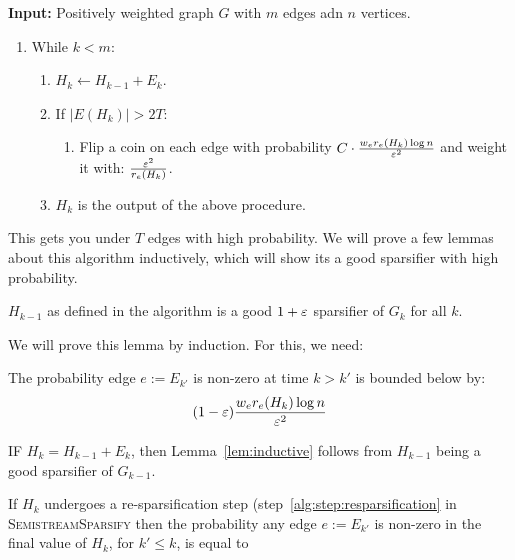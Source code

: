\begin{algorithm}
  \caption{$\textsc{SemistreamSparsify}(G, \eps)$}
\textbf{Input:} Positively weighted graph $G$ with $m$ edges adn $n$ vertices.

\begin{enumerate}
\item While $k < m$:
\begin{enumerate}
  \item $H_k \leftarrow H_{k-1} + E_k$.
  \item If $|E(H_k)| > 2T$:
    \begin{enumerate}
    \item Flip a coin on each edge with probability 
    $C \cdot \frac{w_e r_e(H_k) \log n}{\varepsilon^2}$ 
    and weight it with: $\frac{\varepsilon^2}{r_e(H_k)}$.
    \label{alg:step:resparsification}
    \end{enumerate}
  \item $H_k$ is the output of the above procedure.
\end{enumerate}
\end{enumerate}
\label{alg:semi-stream}
\end{algorithm}

This gets you under $T$ edges with high probability. We will prove a few
lemmas about this algorithm inductively, which will show its a good
sparsifier with high probability.

\begin{lemma}
\label{lem:inductive}
$H_{k-1}$ as defined in the algorithm is a good $1+\varepsilon$ sparsifier of
$G_k$ for all $k$.
\end{lemma}
We will prove this lemma by induction. For this, we need:


\begin{lemma}
\label{lem:ER}
The probability edge $e:=E_{k'}$ is non-zero at time $k > k'$ is bounded
below
by:
\begin{align}
(1-\varepsilon) \frac{w_e r_e(H_k) \log n}{\varepsilon^2}
\end{align}
\end{lemma}

IF $H_k = H_{k-1} + E_k$, then Lemma~\ref{lem:inductive} follows from
$H_{k-1}$ being a good sparsifier of $G_{k-1}$.

If $H_k$ undergoes a re-sparsification step
(step~\ref{alg:step:resparsification} in \textsc{SemistreamSparsify}
 then the probability any edge $e:=E_{k'}$ is non-zero in the final value
 of $H_k$, for $k' \leq k$, is
 equal to

